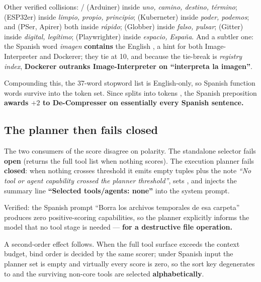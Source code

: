 Other verified collisions: / (Arduiner) inside \emph{uno,
camino, destino, término};  (ESP32er) inside \emph{limpio, propio,
principio};  (Kuberneter) inside \emph{poder, podemos};  and
 (PSer, Apirer) both inside \emph{rápido};  (Globber) inside
\emph{falso, pulsar};  (Gitter) inside \emph{digital, legítimo};
 (Playwrighter) inside \emph{espacio, España}. And a subtler one: the
Spanish word \emph{imagen} \textbf{contains} the English , a hint for
both Image-Interpreter and Dockerer; they tie at 10, and because the tie-break is
\emph{registry index}, \textbf{Dockerer outranks Image-Interpreter on
\foreignlanguage{spanish}{``interpreta la imagen''}}.

Compounding this, the 37-word stopword list is English-only, so Spanish function
words survive into the token set. Since  splits
into tokens , the Spanish preposition
\textbf{ awards $+2$ to De-Compresser on essentially every Spanish
sentence.}

\subsection{The planner then fails closed}
\label{sec:planner-fails-closed}

The two consumers of the score disagree on polarity. The standalone selector
fails \textbf{open} (returns the full tool list when nothing scores). The
execution planner fails \textbf{closed}: when nothing crosses threshold it emits
empty tuples plus the note \emph{``No tool or agent capability crossed the
planner threshold''}, sets , and injects the
summary line \textbf{``Selected tools/agents: none''} into the system prompt.

Verified: the Spanish prompt \foreignlanguage{spanish}{``Borra los archivos
temporales de esa carpeta''} produces zero positive-scoring capabilities, so the
planner explicitly informs the model that no tool stage is needed --- \textbf{for
a destructive file operation.}

A second-order effect follows. When the full tool surface exceeds the context
budget, bind order is decided by the same scorer; under Spanish input the planner
set is empty and virtually every score is zero, so the sort key degenerates to
 and the surviving non-core tools are selected
\textbf{alphabetically}.

